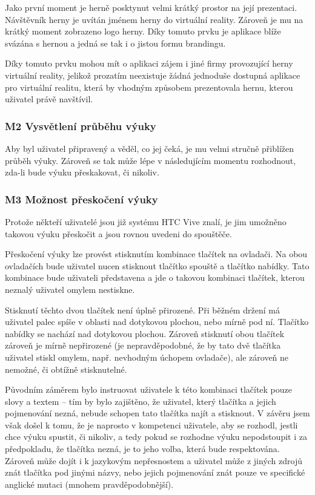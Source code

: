 Jako první moment je herně posktynut velmi krátký prostor na její
prezentaci. Návštěvník herny je uvítán jménem herny do virtuální
reality. Zároveň je mu na krátký moment zobrazeno logo herny. Díky
tomuto prvku je aplikace blíže svázána s hernou a jedná se tak i o
jistou formu brandingu.

Díky tomuto prvku mohou mít o aplikaci zájem i jiné firmy provozující
herny virtuální reality, jelikož prozatím neexistuje žádná jednoduše
dostupná aplikace pro virtuální realitu, která by vhodným způsobem
prezentovala hernu, kterou uživatel právě navštívil.

\subsubsection{M2 Vysvětlení průběhu
výuky}\label{m2-vysvux11btlenuxed-prux16fbux11bhu-vuxfduky}

Aby byl uživatel připravený a věděl, co jej čeká, je mu velmi stručně
přiblížen průběh výuky. Zároveň se tak může lépe v následujícím momentu
rozhodnout, zda-li bude výuku přeskakovat, či nikoliv.

\subsubsection{M3 Možnost přeskočení
výuky}\label{m3-moux17enost-pux159eskoux10denuxed-vuxfduky}

Protože někteří uživatelé jsou již systému HTC Vive znalí, je jim
umožněno takovou výuku přeskočit a jsou rovnou uvedeni do spouštěče.

Přeskočení výuky lze provést stisknutím kombinace tlačítek na ovladači.
Na obou ovladačích bude uživatel nucen stisknout tlačítko spouště a
tlačítko nabídky. Tato kombinace bude uživateli představena a jde o
takovou kombinaci tlačítek, kterou neznalý uživatel omylem nestiskne.

Stisknutí těchto dvou tlačítek není úplně přirozené. Při běžném držení
má uživatel palec spíše v oblasti nad dotykovou plochou, nebo mírně pod
ní. Tlačítko nabídky se nachází nad dotykovou plochou. Zároveň stisknutí
obou tlačítek zároveň je mírně nepřirozené (je nepravděpodobné, že by
tato dvě tlačítka uživatel stiskl omylem, např. nevhodným úchopem
ovladače), ale zároveň ne nemožné, či obtížně stisknutelné.

Původním záměrem bylo instruovat uživatele k této kombinaci tlačítek
pouze slovy a textem -- tím by bylo zajištěno, že uživatel, který
tlačítka a jejich pojmenování nezná, nebude schopen tato tlačítka najít
a stisknout. V závěru jsem však došel k tomu, že je naprosto v
kompetenci uživatele, aby se rozhodl, jestli chce výuku spustit, či
nikoliv, a tedy pokud se rozhodne výuku nepodstoupit i za předpokladu,
že tlačítka nezná, je to jeho volba, která bude respektována. Zároveň
může dojít i k jazykovým nepřesnostem a uživatel může z jiných zdrojů
znát tlačítka pod jinými názvy, nebo jejich pojmenování znát pouze ve
specifické anglické mutaci (mnohem pravděpodobnější).

